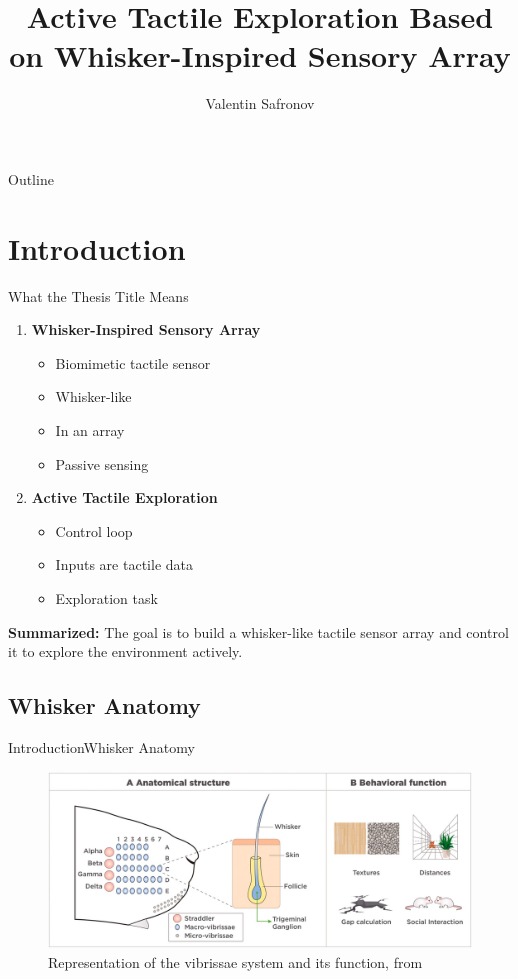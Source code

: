 \documentclass[AIRbeamer
,optEnglish
,optBiber
,optBibstyleAlphabetic
,optBeamerClassicFormat%
]{AIRlatex}
\title[Active Tactile Exploration Based on Whisker-Inspired Sensory Array]{Active Tactile Exploration Based on Whisker-Inspired Sensory Array}
\author[Valentin Safronov]{Valentin Safronov}
\date{\AIRutilsDate{28}{03}{2025}}
\begin{document}
    \AIRbeamerTitlePageStudentThesis

    \begin{frame}{Outline}
        \tableofcontents
    \end{frame}


    \section{Introduction}

    \begin{frame}{What the Thesis Title Means}
        \begin{enumerate}
            \item \textbf{Whisker-Inspired Sensory Array}
            \begin{itemize}
                \item Biomimetic tactile sensor
                \item Whisker-like
                \item In an array
                \item Passive sensing
            \end{itemize}
            \item \textbf{Active Tactile Exploration}
            \begin{itemize}
                \item Control loop
                \item Inputs are tactile data
                \item Exploration task
            \end{itemize}
        \end{enumerate}
        \textbf{Summarized:} The goal is to build a whisker-like tactile sensor array and control it to explore the environment actively.
    \end{frame}

    \subsection{Whisker Anatomy}
    \begin{frame}{Introduction}{Whisker Anatomy}
        \begin{figure}[htb]
            \centering
            \includegraphics[width=\textwidth]{figures/whisker-anatomy}
            \caption{Representation of the vibrissae system and its function, from~\cite{IBARRACASTANEDA2022100034}}
        \end{figure}
    \end{frame}
\end{document}

